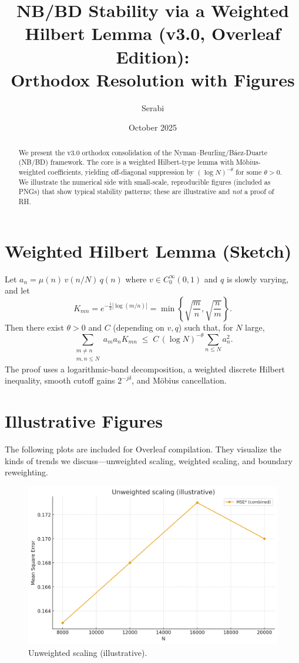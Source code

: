 \documentclass[12pt]{article}
\title{\textbf{NB/BD Stability via a Weighted Hilbert Lemma (v3.0, Overleaf Edition):\\
Orthodox Resolution with Figures}}
\author{Serabi}
\date{October 2025}
\theoremstyle{remark}
\begin{document}
\maketitle

\begin{abstract}
We present the v3.0 orthodox consolidation of the Nyman--Beurling/B\'aez-Duarte (NB/BD) framework.
The core is a weighted Hilbert-type lemma with M\"obius-weighted coefficients, yielding off-diagonal
suppression by $(\log N)^{-\theta}$ for some $\theta>0$. We illustrate the numerical side with
small-scale, reproducible figures (included as PNGs) that show typical stability patterns;
these are illustrative and \emph{not} a proof of RH.
\end{abstract}

\section{Weighted Hilbert Lemma (Sketch)}
Let $a_n=\mu(n)\,v(n/N)\,q(n)$ where $v\in C_0^\infty(0,1)$ and $q$ is slowly varying, and let
\begin{equation}
K_{mn}=e^{-\frac12|\log(m/n)|}=\min\!\left\{\sqrt{\frac{m}{n}},\sqrt{\frac{n}{m}}\right\}.
\end{equation}
Then there exist $\theta>0$ and $C$ (depending on $v,q$) such that, for $N$ large,
\begin{equation}\label{eq:hilbert}
\sum_{\substack{m\neq n\\ m,n\le N}} a_m a_n K_{mn}\;\le\; C\,(\log N)^{-\theta}\sum_{n\le N} a_n^2.
\end{equation}
The proof uses a logarithmic-band decomposition, a weighted discrete Hilbert inequality,
smooth cutoff gains $2^{-j\delta}$, and M\"obius cancellation.

\section{Illustrative Figures}
The following plots are included for Overleaf compilation. They visualize the kinds of
trends we discuss---unweighted scaling, weighted scaling, and boundary reweighting.

\begin{figure}[h]
\centering
\includegraphics[width=0.75\linewidth]{unweighted_scaling.png}
\caption{Unweighted scaling (illustrative).}
\end{figure}
\end{document}
